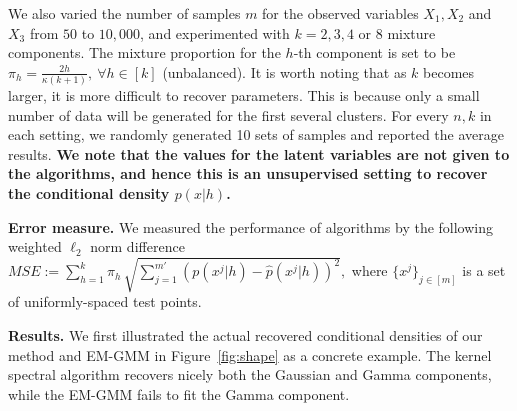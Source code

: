 \documentclass{article}
\begin{document}
We also varied the number of samples $m$ for the observed variables $X_1,X_2$ and $X_3$ from $50$ to $10,000$, and
experimented with $k=2,3,4$ or $8$ mixture components.
The mixture proportion for the $h$-th component is set to be $\pi_h= \frac{2h}{\kappa(k+1)},~\forall h\in[k]$ (unbalanced). It is worth noting that as $k$ becomes larger, it is more difficult to recover parameters. This is because only a small number of data will be generated for the first several clusters. For every $n,k$ in each setting, we randomly generated 10 sets of samples and reported the average results. {\bf We note that the values for the latent variables are not given to the algorithms, and hence this is an unsupervised setting to recover the conditional density $p(x|h)$.}

{\bf Error measure.} We measured the performance of algorithms by the
following weighted $\ell_2$ norm difference
$
  MSE:=\sum_{h=1}^{k} \pi_h\, \sqrt{\sum_{j=1}^{m'} (p(x^j|h) - \widehat{p}(x^j|h))^2 },
$
where $\{x^j\}_{j\in[m]}$ is a set of uniformly-spaced test points.
%
%
%

{\bf Results.} We first illustrated the actual recovered conditional densities of our method and EM-GMM in Figure~\ref{fig:shape} as a concrete example. The kernel spectral algorithm recovers nicely both the Gaussian and Gamma components, while the EM-GMM fails to fit the Gamma component.
\end{document}
